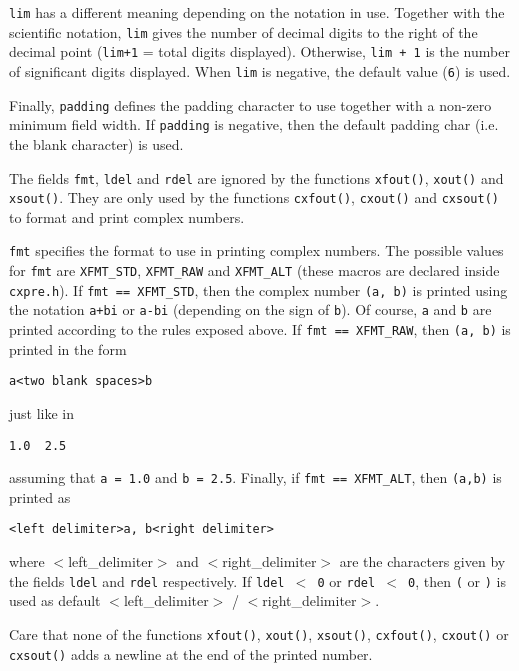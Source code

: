 \documentclass{article}
\begin{document}
\texttt{lim} has a different meaning depending on the notation in use.
Together with the scientific notation, \texttt{lim} gives the number of
decimal digits to the right of the decimal point
(\texttt{lim+1} = total digits displayed). Otherwise, \texttt{lim + 1} is the
number of significant digits displayed. When \texttt{lim} is negative,
the default value (\texttt{6}) is used.

Finally, \texttt{padding} defines the padding character to use together
with a non-zero minimum field width.
If \texttt{padding} is negative, then the default padding char (i.e. the
blank character) is used.

The fields \texttt{fmt}, \texttt{ldel} and \texttt{rdel} are ignored by the functions
\texttt{xfout()}, \texttt{xout()} and \texttt{xsout()}. They are only used by the
functions \texttt{cxfout()}, \texttt{cxout()} and \texttt{cxsout()} to
format and print complex numbers.

\texttt{fmt} specifies the format to use in printing complex numbers.
The possible values for \texttt{fmt} are \texttt{XFMT\_STD}, \texttt{XFMT\_RAW} and \texttt{XFMT\_ALT}
(these macros are declared inside \texttt{cxpre.h}).
If \texttt{fmt == XFMT\_STD}, then the complex number \texttt{(a, b)} is printed
using the notation \texttt{a+bi} or \texttt{a-bi} (depending on the sign of \texttt{b}).
Of course, \texttt{a} and \texttt{b} are printed according to the rules
exposed above.
If \texttt{fmt == XFMT\_RAW}, then \texttt{(a, b)} is printed in the form

\begin{verbatim}
a<two blank spaces>b
\end{verbatim}
just like in

\begin{verbatim}
1.0  2.5
\end{verbatim}
assuming that \texttt{a = 1.0} and \texttt{b = 2.5}.
Finally, if \texttt{fmt == XFMT\_ALT}, then \texttt{(a,b)} is printed
as

\begin{verbatim}
<left delimiter>a, b<right delimiter>
\end{verbatim}
where $<$left\_delimiter$>$ and $<$right\_delimiter$>$ are the characters
given by the fields \texttt{ldel} and \texttt{rdel} respectively.
If \texttt{ldel $<$ 0} or \texttt{rdel $<$ 0}, then \texttt{(} or \texttt{)}  is used as
default $<$left\_delimiter$>$ / $<$right\_delimiter$>$.

Care that none of the functions \texttt{xfout()}, \texttt{xout()}, \texttt{xsout()},
\texttt{cxfout()}, \texttt{cxout()} or \texttt{cxsout()} adds a newline at the end
of the printed number.
\end{document}
